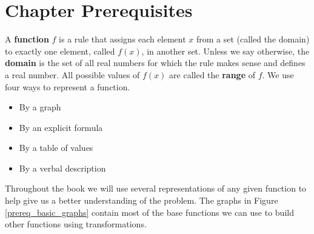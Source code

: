 \addtocounter{section}{-1}
\section{Chapter Prerequisites}
\prereqIntro

A \textbf{function} $f$ is a rule that assigns each element $x$ from a set (called the domain) to exactly one element, called $f(x)$, in another set. Unless we say otherwise, the \textbf{domain} is the set of all real numbers for which the rule makes sense and defines a real number. All possible values of $f(x)$ are called the \textbf{range} of $f$. We use four ways to represent a function.\\
\begin{minipage}{.5\linewidth}
\begin{itemize}
\item By a graph
\item By an explicit formula
\end{itemize}
\end{minipage}%
\begin{minipage}{.5\linewidth}
\begin{itemize}
\item By a table of values
\item By a verbal description
\end{itemize}
\end{minipage}

Throughout the book we will use several representations of any given function to help give us a better understanding of the problem. The graphs in Figure \ref{prereq_basic_graphs} contain most of the base functions we can use to build other functions using transformations.


